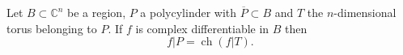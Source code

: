 Let $B \subset \mathbb{C}^n$ be a region, $P$ a polycylinder with $\overline{P} \subset B$ and $T$ the $n$-dimensional torus belonging to $P$. If $f$ is complex differentiable in $B$ then
$$f|P = \operatorname{ch}(f|T).$$
